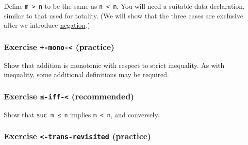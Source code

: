 Define \texttt{m\ \textgreater{}\ n} to be the same as
\texttt{n\ \textless{}\ m}. You will need a suitable data declaration,
similar to that used for totality. (We will show that the three cases
are exclusive after we introduce
\protect\hyperlink{Negation}{negation}.)

\begin{fence}
\begin{code}%
\>[0]\<%
\end{code}
\end{fence}

\hypertarget{Relations-plus-mono-less}{%
\subsubsection{\texorpdfstring{Exercise \texttt{+-mono-\textless{}}
(practice)}{Exercise +-mono-\textless{} (practice)}}\label{Relations-plus-mono-less}}

Show that addition is monotonic with respect to strict inequality. As
with inequality, some additional definitions may be required.

\begin{fence}
\begin{code}%
\>[0]\<%
\end{code}
\end{fence}

\hypertarget{Relations-leq-iff-less}{%
\subsubsection{\texorpdfstring{Exercise \texttt{≤-iff-\textless{}}
(recommended)}{Exercise ≤-iff-\textless{} (recommended)}}\label{Relations-leq-iff-less}}

Show that \texttt{suc\ m\ ≤\ n} implies \texttt{m\ \textless{}\ n}, and
conversely.

\begin{fence}
\begin{code}%
\>[0]\<%
\end{code}
\end{fence}

\hypertarget{Relations-less-trans-revisited}{%
\subsubsection{\texorpdfstring{Exercise
\texttt{\textless{}-trans-revisited}
(practice)}{Exercise \textless-trans-revisited (practice)}}\label{Relations-less-trans-revisited}}

